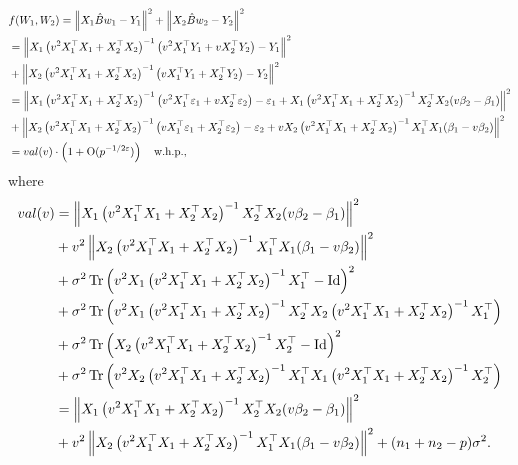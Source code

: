 {\color{red}\begin{align*}
			& f(W_1, W_2) = \left\| X_1 \hat B w_1 - Y_1 \right\|^2 + \left\| X_2 \hat B w_2 - Y_2 \right\|^2\\
			& =\left\| X_1\left( v^2 X_1^{\top}X_1 + X_2^{\top}X_2\right)^{-1} \left(v^2 X_1^{\top}Y_1 + vX_2^{\top}Y_2\right) - Y_1 \right\|^2 \\
			&+ \left\| X_2 \left( v^2 X_1^{\top}X_1 + X_2^{\top}X_2\right)^{-1} \left(vX_1^{\top}Y_1 + X_2^{\top}Y_2\right) - Y_2 \right\|^2 \\
			& =\left\| X_1\left( v^2 X_1^{\top}X_1 + X_2^{\top}X_2\right)^{-1} \left(v^2 X_1^{\top}{\varepsilon}_1 + vX_2^{\top}{\varepsilon}_2\right) - {\varepsilon}_1 + X_1\left( v^2 X_1^{\top}X_1 + X_2^{\top}X_2\right)^{-1}  X_2^{\top}X_2(v\beta_2-\beta_1)  \right\|^2 \\
			&+ \left\| X_2 \left( v^2 X_1^{\top}X_1 + X_2^{\top}X_2\right)^{-1} \left(vX_1^{\top}{\varepsilon}_1 + X_2^{\top}{\varepsilon}_2\right) - {\varepsilon}_2 + vX_2 \left( v^2 X_1^{\top}X_1 + X_2^{\top}X_2\right)^{-1}  X_1^{\top}X_1(\beta_1-v\beta_2)  \right\|^2 \\
			&=val(v)\cdot \left( 1+\operatorname{O}(p^{-1/2{\varepsilon}})\right) \quad \text{w.h.p.},
		\end{align*}
		where
		\begin{align*}
		val(v)&=\left\| X_1\left( v^2 X_1^{\top}X_1 + X_2^{\top}X_2\right)^{-1}  X_2^{\top}X_2(v\beta_2-\beta_1)  \right\|^2 \\
			&+ v^2\left\| X_2 \left( v^2 X_1^{\top}X_1 + X_2^{\top}X_2\right)^{-1}  X_1^{\top}X_1(\beta_1-v\beta_2)  \right\|^2 \\
			&+\sigma^2 \operatorname{Tr}\left(v^2 X_1\left( v^2 X_1^{\top}X_1 + X_2^{\top}X_2\right)^{-1}   X_1^{\top} -\operatorname{Id}\right)^2 \\
			&+\sigma^2 \operatorname{Tr}\left(v^2 X_1\left( v^2 X_1^{\top}X_1 + X_2^{\top}X_2\right)^{-1}X_2^{\top}X_2 \left( v^2 X_1^{\top}X_1 + X_2^{\top}X_2\right)^{-1} X_1^\top\right)\\
			&+\sigma^2 \operatorname{Tr}\left(X_2 \left( v^2 X_1^{\top}X_1 + X_2^{\top}X_2\right)^{-1} X_2^{\top} -\operatorname{Id}\right)^2 \\
			&+\sigma^2 \operatorname{Tr}\left(v^2 X_2\left( v^2 X_1^{\top}X_1 + X_2^{\top}X_2\right)^{-1}X_1^{\top}X_1 \left( v^2 X_1^{\top}X_1 + X_2^{\top}X_2\right)^{-1} X_2^\top\right)\\
			&=\left\| X_1\left( v^2 X_1^{\top}X_1 + X_2^{\top}X_2\right)^{-1}  X_2^{\top}X_2(v\beta_2-\beta_1)  \right\|^2 \\
			&+ v^2\left\| X_2 \left( v^2 X_1^{\top}X_1 + X_2^{\top}X_2\right)^{-1}  X_1^{\top}X_1(\beta_1-v\beta_2)  \right\|^2 +(n_1+n_2-p)\sigma^2.
		\end{align*}
	}


